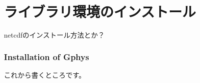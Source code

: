 \chapter{ライブラリ環境のインストール}
\label{sec:env_setting}
netcdfのインストール方法とか？


\subsection{Installation of Gphys}

これから書くところです。




